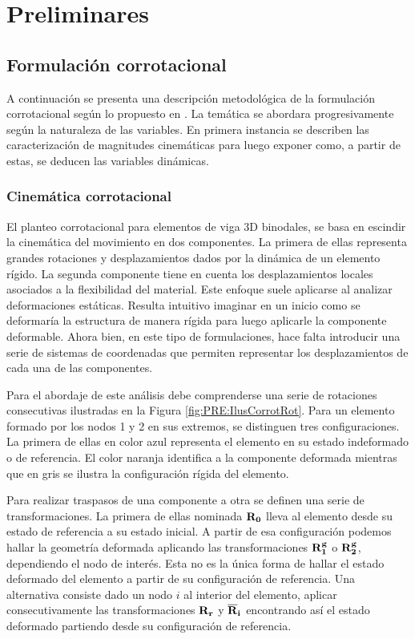 \chapter{Preliminares}\label{Cap:Preliminares}
\linenumbers
\section{Formulación corrotacional}\label{Sec:PRE:CorrotFormul}

A continuación se presenta una descripción metodológica de la formulación corrotacional según lo propuesto en \citep{Le2014}. La temática se abordara progresivamente según la naturaleza de las variables. En primera instancia se describen las caracterización de magnitudes cinemáticas para luego exponer como, a partir de estas, se deducen las variables dinámicas. 

\subsection{Cinemática corrotacional}\label{Subsec:PRE:CienmaticCorrot}

El planteo corrotacional para elementos de viga 3D binodales, se basa en escindir la cinemática del movimiento en dos componentes. La primera de ellas representa grandes rotaciones y desplazamientos dados por la dinámica de un elemento rígido. La segunda componente tiene en cuenta los desplazamientos locales asociados a la flexibilidad del material. Este enfoque suele aplicarse al analizar deformaciones estáticas. Resulta intuitivo imaginar en un inicio como se deformaría la estructura de manera rígida para luego aplicarle la componente deformable. Ahora bien, en este tipo de formulaciones, hace falta introducir una serie de sistemas de coordenadas que permiten representar los desplazamientos de cada una de las componentes.

Para el abordaje de este análisis debe comprenderse una serie de rotaciones consecutivas ilustradas en la Figura \ref{fig:PRE:IlusCorrotRot}. Para un elemento formado por los nodos 1 y 2 en sus extremos, se distinguen tres configuraciones. La primera de ellas en color azul representa el elemento en su estado indeformado o de referencia. El color naranja identifica a la componente deformada mientras que en gris se ilustra la configuración rígida del elemento. 

Para realizar traspasos de una componente a otra se definen una serie de transformaciones. La primera de ellas nominada $\bf{R}_0$ lleva al elemento desde su estado de referencia a su estado inicial. A partir de esa configuración podemos hallar la geometría deformada aplicando las transformaciones $\bf{R}_1^g$ o $\bf{R}_2^g$, dependiendo el nodo de interés. Esta no es la única forma de hallar el estado deformado del elemento a partir de su configuración de referencia. Una alternativa consiste dado un nodo $i$ al interior del elemento, aplicar consecutivamente las transformaciones $\bf{R}_r$ y $\bf{\overline{R}}_i$ encontrando así el estado deformado partiendo desde su configuración de referencia.  

